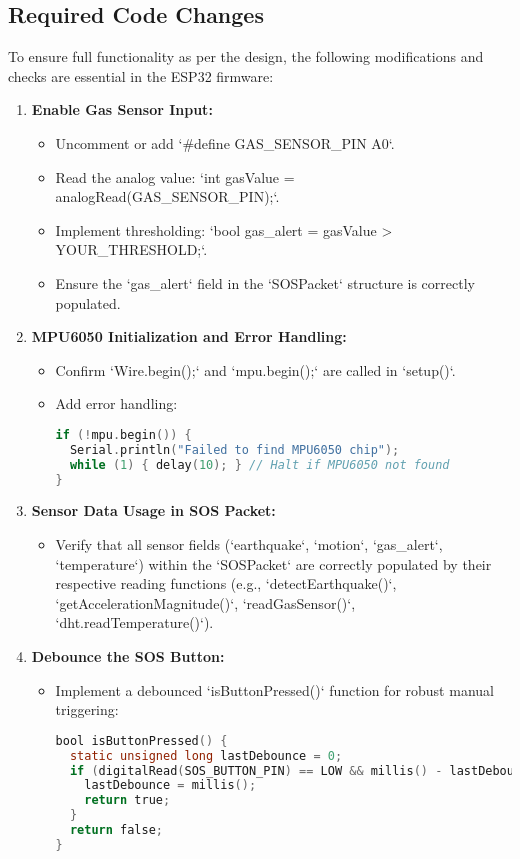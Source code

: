 \documentclass[12pt, a4paper]{article}
\begin{document}
\subsection{Required Code Changes}
To ensure full functionality as per the design, the following modifications and checks are essential in the ESP32 firmware:
\begin{enumerate}
    \item \textbf{Enable Gas Sensor Input:}
    \begin{itemize}
        \item Uncomment or add `#define GAS_SENSOR_PIN A0`.
        \item Read the analog value: `int gasValue = analogRead(GAS_SENSOR_PIN);`.
        \item Implement thresholding: `bool gas_alert = gasValue > YOUR_THRESHOLD;`.
        \item Ensure the `gas_alert` field in the `SOSPacket` structure is correctly populated.
    \end{itemize}
    \item \textbf{MPU6050 Initialization and Error Handling:}
    \begin{itemize}
        \item Confirm `Wire.begin();` and `mpu.begin();` are called in `setup()`.
        \item Add error handling:
        \begin{lstlisting}[language=C]
if (!mpu.begin()) {
  Serial.println("Failed to find MPU6050 chip");
  while (1) { delay(10); } // Halt if MPU6050 not found
}
        \end{lstlisting}
    \end{itemize}
    \item \textbf{Sensor Data Usage in SOS Packet:}
    \begin{itemize}
        \item Verify that all sensor fields (`earthquake`, `motion`, `gas_alert`, `temperature`) within the `SOSPacket` are correctly populated by their respective reading functions (e.g., `detectEarthquake()`, `getAccelerationMagnitude()`, `readGasSensor()`, `dht.readTemperature()`).
    \end{itemize}
    \item \textbf{Debounce the SOS Button:}
    \begin{itemize}
        \item Implement a debounced `isButtonPressed()` function for robust manual triggering:
        \begin{lstlisting}[language=C]
bool isButtonPressed() {
  static unsigned long lastDebounce = 0;
  if (digitalRead(SOS_BUTTON_PIN) == LOW && millis() - lastDebounce > 300) {
    lastDebounce = millis();
    return true;
  }
  return false;
}
        \end{lstlisting}
    \end{itemize}
\end{enumerate}
\end{document}
